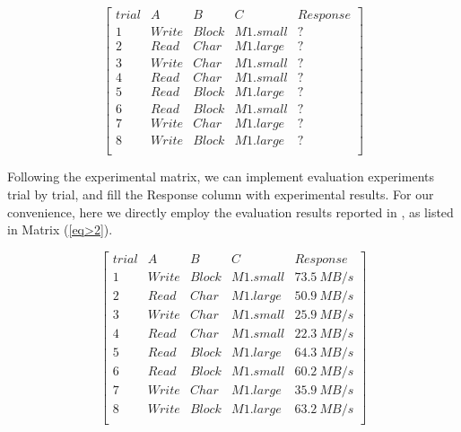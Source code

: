 \documentclass[10pt, conference, compsocconf]{IEEEtran}
\begin{document}
\begin{small}
\begin{equation}
\label{eq>1}
\left[
  \begin{array}{ccccc}
    trial & A & B & C & Response\\
    1 & Write & Block & M1.small & ? \\
    2 & Read & Char & M1.large & ? \\
    3 & Write & Char & M1.small & ?\\
    4 & Read & Char & M1.small & ?\\
    5 & Read & Block & M1.large & ?\\
    6 & Read & Block & M1.small & ?\\
    7 & Write & Char & M1.large & ?\\
    8 & Write & Block & M1.large & ?\\
  \end{array}
\right]
\end{equation} 
\end{small}

Following the experimental matrix, we can implement evaluation experiments trial by trial, and fill the Response column with experimental results. For our convenience, here we directly employ the evaluation results reported in \cite{Iosup_Ostermann_2011}, as listed in Matrix (\ref{eq>2}).

\begin{small}
\begin{equation}
\label{eq>2}
\left[
  \begin{array}{ccccc}
    trial & A & B & C & Response\\
    1 & Write & Block & M1.small & 73.5~MB/s \\
    2 & Read & Char & M1.large & 50.9~MB/s \\
    3 & Write & Char & M1.small & 25.9~MB/s\\
    4 & Read & Char & M1.small & 22.3~MB/s\\
    5 & Read & Block & M1.large & 64.3~MB/s\\
    6 & Read & Block & M1.small & 60.2~MB/s\\
    7 & Write & Char & M1.large & 35.9~MB/s\\
    8 & Write & Block & M1.large & 63.2~MB/s\\
  \end{array}
\right]
\end{equation} 
\end{small}
\end{document}
